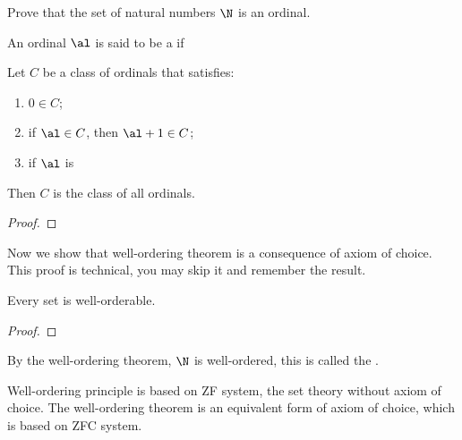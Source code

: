 \documentclass[10pt]{article}
\begin{document}
\begin{problem}
    Prove that the set of natural numbers $\N$ is an ordinal.
\end{problem}
\begin{definition}
    An ordinal $\al$ is said to be a  if 
\end{definition}
\begin{theorem}
    Let $C$ be a class of ordinals that satisfies:
    \begin{enumerate}
        \item $0\in C$;
        \item if $\al\in C$, then $\al+1\in C$;
        \item if $\al$ is 
    \end{enumerate}
    Then $C$ is the class of all ordinals.
\end{theorem}
\begin{proof}
    
\end{proof}
\begin{Axiom of choice}

\end{Axiom of choice}
\begin{example}
    
\end{example}
\begin{problem}
    
\end{problem}
\par
Now we show that well-ordering theorem is a consequence of axiom of choice. This proof is technical, you may skip it and remember the result.
\begin{theorem}
    Every set is well-orderable.
\end{theorem}
\begin{proof}
 
\end{proof}
\par
By the well-ordering theorem, $\N$ is well-ordered, this is called the .
\begin{remark}
    Well-ordering principle is based on ZF system, the set theory without axiom of choice. The well-ordering theorem is an equivalent form of axiom of choice, which is based on ZFC system.
\end{remark}
\begin{axiom of regularity}

\end{axiom of regularity}
\newpage
\end{document}
